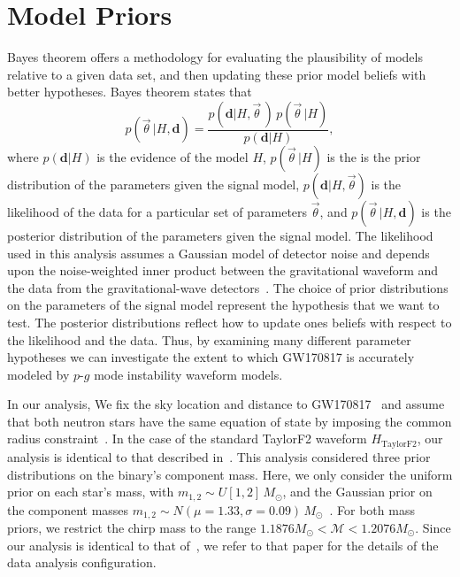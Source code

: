 \section{Model Priors} \label{sec:priors}
Bayes theorem offers a methodology for evaluating the plausibility of models relative to a given data set, and then updating these prior model beliefs with better hypotheses. Bayes theorem states that
\begin{equation}
p\left(\vec{\theta}\,| H, \mathbf{d}\right) = \frac{ p\left(\mathbf{d}|H, \vec{\theta}\,\right)\, p\left(\vec{\theta}\,|H\right)}{p\left(\mathbf{d}|H\right)},
\label{eq:bayestheorem}
\end{equation}
where $p \left(\mathbf{d}|H \right)$ is the evidence of the model $H$, $p\left(\vec{\theta}\,|H\right)$ is the is the prior distribution of the parameters given the signal model, $p\left(\mathbf{d}|H, \vec{\theta}\right)$ is the likelihood of the data for a particular set of parameters $\vec{\theta}$, and $p\left( \vec{\theta}\,|H, \mathbf{d}\right)$ is the posterior distribution of the parameters given the signal model. The likelihood used in this analysis assumes a Gaussian model of detector noise and depends upon the noise-weighted inner product between the gravitational waveform and the data from the gravitational-wave detectors~\citep{Finn:2000hj,Rover:2006bb}. The choice of prior distributions on the parameters of the signal model represent the hypothesis that we want to test. The posterior distributions reflect how to update ones beliefs with respect to the likelihood and the data. Thus, by examining many different parameter hypotheses we can investigate the extent to which GW170817 is accurately modeled by $p$-$g$ mode instability waveform models.

In our analysis, We fix the sky location and distance to GW170817~\citep{Soares-Santos:2017lru,Cantiello:2018ffy} and assume that both neutron stars have the same equation of state by imposing the common radius constraint~\citep{de2018tidal}. In the case of the standard TaylorF2 waveform $H_\mathrm{TaylorF2}$, our analysis is identical to that described in~\cite{de2018tidal}. This analysis considered three prior distributions on the binary's component mass. Here, we only consider the uniform prior on each star's mass, with $m_{1,2} \sim U[1,2]\, M_\odot$, and the Gaussian prior on the component masses $m_{1,2} \sim N(\mu = 1.33, \sigma = 0.09)\, M_\odot$~\citep{Ozel:2016oaf}. For both mass priors, we restrict the chirp mass to the range $ 1.1876 M_\odot < \mathcal{M} < 1.2076 M_\odot$. Since our analysis is identical to that of~\citep{de2018tidal}, we refer to that paper for the details of the data analysis configuration.

